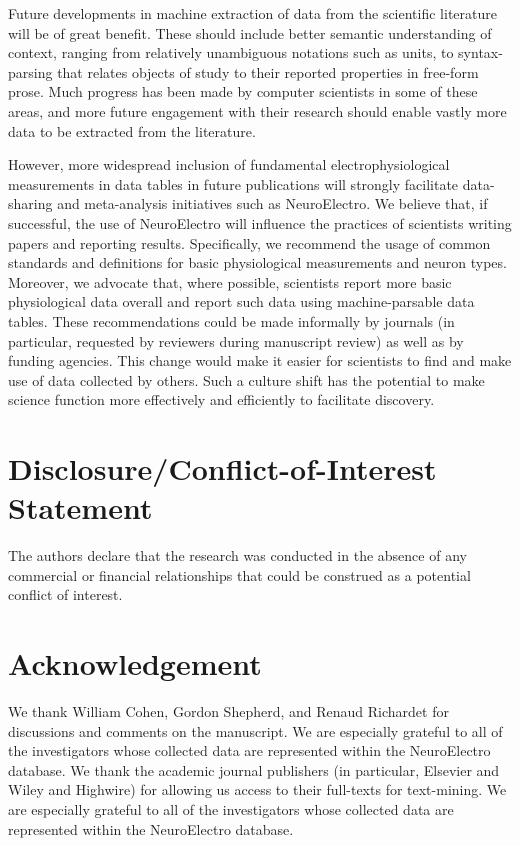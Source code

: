 \documentclass{template/frontiersSCNS} %
\begin{document}
Future developments in machine extraction of data from the scientific literature will be of great benefit.  
These should include better semantic understanding of context, ranging from relatively unambiguous notations such as units, to syntax-parsing that relates objects of study to their reported properties in free-form prose.  
Much progress has been made by computer scientists in some of these areas, and more future engagement with their research should enable vastly more data to be extracted from the literature.  

However, more widespread inclusion of fundamental electrophysiological measurements in data tables in future publications will strongly facilitate data-sharing and meta-analysis initiatives such as NeuroElectro.  
We believe that, if successful, the use of NeuroElectro will influence the practices of scientists writing papers and reporting results.  
Specifically, we recommend the usage of common standards and definitions for basic physiological measurements\citep{toledo-rodriguez_correlation_2004} and neuron types\citep{ascoli_petilla_2008,larson_neurolex.org:_2013}.  
Moreover, we advocate that, where possible, scientists report more basic physiological data overall and report such data using machine-parsable data tables.  
These recommendations could be made informally by journals (in particular, requested by reviewers during manuscript review) as well as by funding agencies.
This change would make it easier for scientists to find and make use of data collected by others.  
Such a culture shift has the potential to make science function more effectively and efficiently to facilitate discovery.   

\section*{Disclosure/Conflict-of-Interest Statement}
The authors declare that the research was conducted in the absence of any commercial or financial relationships that could be construed as a potential conflict of interest.

\section*{Acknowledgement}
We thank William Cohen, Gordon Shepherd, and Renaud Richardet for discussions and comments on the manuscript. 
We are especially grateful to all of the investigators whose collected data are represented within the NeuroElectro database.  
We thank the academic journal publishers (in particular, Elsevier and Wiley and Highwire) for allowing us access to their full-texts for text-mining.  
We are especially grateful to all of the investigators whose collected data are represented within the NeuroElectro database.
\end{document}
